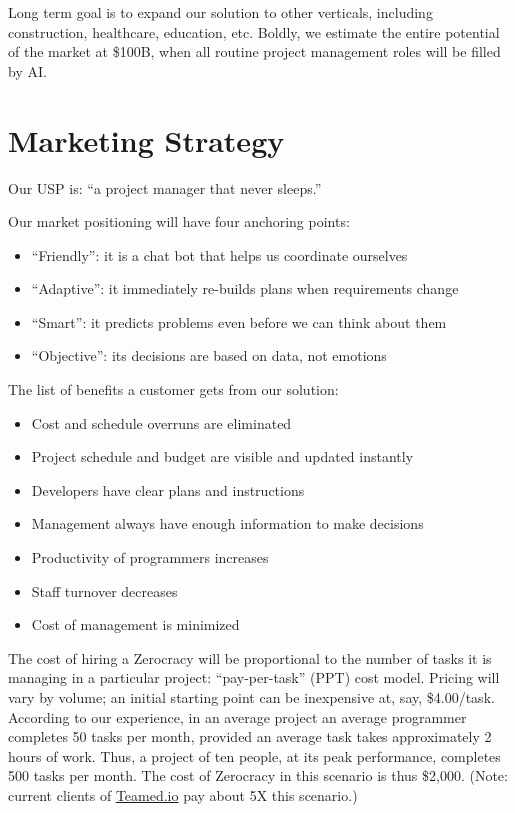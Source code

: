 \documentclass[12pt]{article}
\begin{document}
Long term goal is to expand our solution to other verticals, including
construction, healthcare, education, etc. Boldly, we estimate the entire
potential of the market at \$100B, when all routine project management roles will
be filled by AI.

\section{Marketing Strategy}

Our USP is: ``a project manager that never sleeps.''

Our market positioning will have four anchoring points:

\begin{itemize}
  \item ``Friendly'': it is a chat bot that helps us coordinate ourselves
  \item ``Adaptive'': it immediately re-builds plans when requirements change
  \item ``Smart'': it predicts problems even before we can think about them
  \item ``Objective'': its decisions are based on data, not emotions
\end{itemize}

The list of benefits a customer gets from our solution:

\begin{itemize}
  \item Cost and schedule overruns are eliminated
  \item Project schedule and budget are visible and updated instantly
  \item Developers have clear plans and instructions
  \item Management always have enough information to make decisions
  \item Productivity of programmers increases
  \item Staff turnover decreases
  \item Cost of management is minimized
\end{itemize}

The cost of hiring a Zerocracy will be proportional to the number of tasks it is
managing in a particular project: ``pay-per-task'' (PPT) cost model. Pricing
will vary by volume; an initial starting point can be inexpensive at, say,
\$4.00/task. According to our experience, in an average project an average
programmer completes 50 tasks per month, provided an average task takes
approximately 2 hours of work. Thus, a project of ten people, at its peak
performance, completes 500 tasks per month. The cost of Zerocracy in this
scenario is thus \$2,000. (Note: current clients of \href{http://www.teamed.io}{Teamed.io} pay about 5X this
scenario.)
\end{document}
